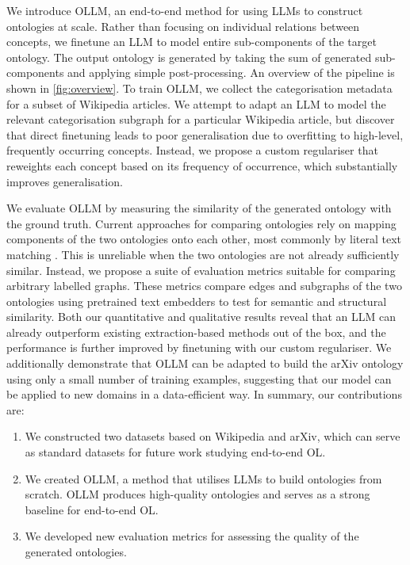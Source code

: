 \documentclass{article}
\newcommand{\name}{{OLLM}\xspace}
\begin{document}
We introduce \name, an end-to-end method for using LLMs to construct ontologies at scale. Rather than focusing on individual relations between concepts, we finetune an LLM to model entire sub-components of the target ontology. The output ontology is generated by taking the sum of generated sub-components and applying simple post-processing. An overview of the pipeline is shown in \cref{fig:overview}. To train \name, we collect the categorisation metadata for a subset of Wikipedia articles. We attempt to adapt an LLM to model the relevant categorisation subgraph for a particular Wikipedia article, but discover that direct finetuning leads to poor generalisation due to overfitting to high-level, frequently occurring concepts. Instead, we propose a custom regulariser that reweights each concept based on its frequency of occurrence, which substantially improves generalisation. 

We evaluate \name by measuring the similarity of the generated ontology with the ground truth. Current approaches for comparing ontologies rely on mapping components of the two ontologies onto each other, most commonly by literal text matching \cite{maedche2002measuring,Treeratpituk2013GraphbasedAT}. This is unreliable when the two ontologies are not already sufficiently similar. Instead, we propose a suite of evaluation metrics suitable for comparing arbitrary labelled graphs. These metrics compare edges and subgraphs of the two ontologies using pretrained text embedders to test for semantic and structural similarity. Both our quantitative and qualitative results reveal that an LLM can already outperform existing extraction-based methods out of the box, and the performance is further improved by finetuning with our custom regulariser. We additionally demonstrate that \name can be adapted to build the arXiv ontology using only a small number of training examples, suggesting that our model can be applied to new domains in a data-efficient way. In summary, our contributions are:
\begin{enumerate}[itemsep=0pt,leftmargin=*]
    \item We constructed two datasets based on Wikipedia and arXiv, which can serve as standard datasets for future work studying end-to-end OL.
    \item We created \name, a method that utilises LLMs to build ontologies from scratch. \name produces high-quality ontologies and serves as a strong baseline for end-to-end OL.
    \item We developed new evaluation metrics for assessing the quality of the generated ontologies. 
\end{enumerate}
\end{document}
